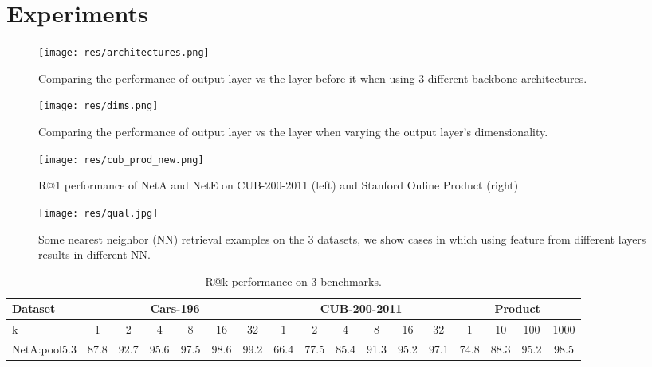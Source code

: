 \documentclass[10pt,twocolumn,letterpaper]{article}
\begin{document}
\section{Experiments}


\begin{figure}
  \texttt{[image: res/architectures.png]}
  \vspace{2pt}
  \caption{Comparing the performance of output layer vs the layer before it when using 3 different backbone architectures.}
  \label{fig:architectures}
\end{figure}


\begin{figure}
  \texttt{[image: res/dims.png]}
  \vspace{2pt}
  \caption{Comparing the performance of output layer vs the layer when varying the output layer's dimensionality.}
  \label{fig:dims}
\end{figure}



\begin{figure*}[h]
\texttt{[image: res/cub\_prod\_new.png]}
\caption{R@1 performance of NetA and NetE on CUB-200-2011 (left) and Stanford Online Product (right)}
\label{fig:cub}
\end{figure*}



\begin{figure*}
\begin{center}
  \texttt{[image: res/qual.jpg]}
  \caption{Some nearest neighbor (NN) retrieval examples on the 3 datasets, we show cases in which using feature from different layers results in different NN.}
  \label{fig:qual}
\end{center}
\end{figure*}


\setlength{\tabcolsep}{5.1pt}
\begin{center}
\begin{table*}[]
\begin{center}
\centering
\label{table:benchmarks0}
\caption{R@k performance on 3 benchmarks.}
\begin{tabular}{| l || cccccc || c ccccc || c ccc |}
\hline
Dataset  & \multicolumn{6}{c||}{Cars-196} 
       & \multicolumn{6}{c||}{CUB-200-2011} 
       & \multicolumn{4}{c|}{Product} 
       \\
\hline

k  &    1 & 2 & 4 & 8 & 16 & 32
        &  1 & 2 & 4 & 8 & 16 & 32
        &  1 & 10 & 100 & 1000
       \\
       
\hline
\hline


NetA:pool5.3  &  87.8 & 92.7 & 95.6 & 97.5 & 98.6 & 99.2
          &  66.4 & 77.5 & 85.4 & 91.3 & 95.2 & 97.1
          &  74.8 & 88.3 & 95.2 & 98.5 \\

\hline

\end{tabular}
\label{table:benchmarks0}
\end{center}
\end{table*}
\end{center}
\end{document}
